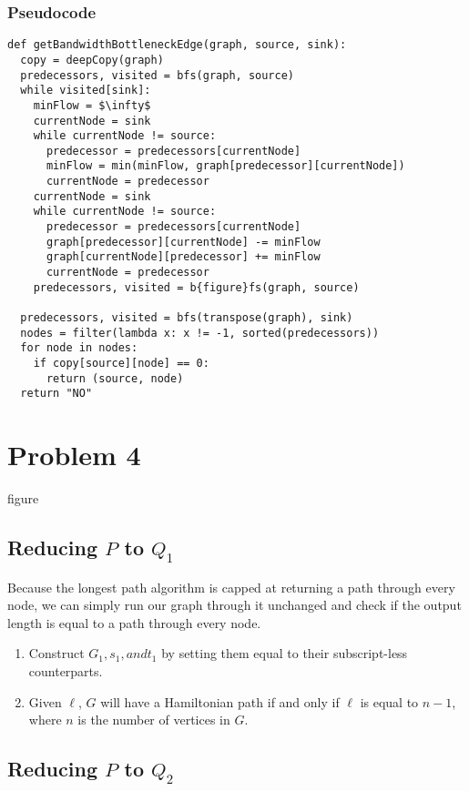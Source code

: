 \documentclass{math}
\begin{document}
\pagebreak

\subsubsection*{Pseudocode}
\begin{lstlisting}[mathescape=true]
def getBandwidthBottleneckEdge(graph, source, sink):
  copy = deepCopy(graph)
  predecessors, visited = bfs(graph, source)
  while visited[sink]:
    minFlow = $\infty$
    currentNode = sink
    while currentNode != source:
      predecessor = predecessors[currentNode]
      minFlow = min(minFlow, graph[predecessor][currentNode])
      currentNode = predecessor
    currentNode = sink
    while currentNode != source:
      predecessor = predecessors[currentNode]
      graph[predecessor][currentNode] -= minFlow
      graph[currentNode][predecessor] += minFlow
      currentNode = predecessor
    predecessors, visited = b{figure}fs(graph, source)

  predecessors, visited = bfs(transpose(graph), sink)
  nodes = filter(lambda x: x != -1, sorted(predecessors))
  for node in nodes:
    if copy[source][node] == 0:
      return (source, node)
  return "NO"
\end{lstlisting}


\section*{Problem 4}

{figure}
\subsection*{Reducing \( P \) to \( Q_1 \)}

Because the longest path algorithm is capped at returning a path through every
node, we can simply run our graph through it unchanged and check if the output
length is equal to a path through every node.  \begin{enumerate}
\renewcommand{\theenumi}{\alph{enumi}}
    \item Construct \( G_1, s_1, and t_1 \) by setting them equal to their
        subscript-less counterparts.
    \item Given \( \ell \), \( G \) will have a Hamiltonian path if and only
        if \( \ell \) is equal to \( n - 1 \), where \( n \) is the number of
        vertices in \( G \).
\end{enumerate}

\subsection*{Reducing \( P \) to \( Q_2 \)}
\end{document}
